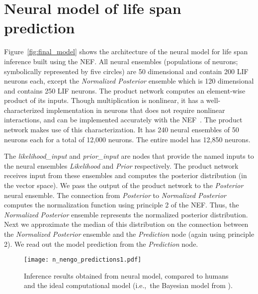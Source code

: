 \documentclass[10pt,letterpaper]{article}
\begin{document}


\section{Neural model of life span prediction}

Figure~\ref{fig:final_model} shows the architecture of the neural model for life span inference built using the NEF. All neural ensembles (populations of neurons; symbolically represented by five circles) are 50 dimensional and contain 200 LIF neurons each, except the \textit{Normalized Posterior} ensemble which is 120 dimensional and contains 250 LIF neurons. The product network computes an element-wise product of its inputs. Though multiplication is nonlinear, it has a well-characterized implementation in neurons that does not require nonlinear interactions, and can be implemented accurately with the NEF~\cite{gosmann2015}. The product network makes use of this characterization. It has 240 neural ensembles of 50 neurons each for a total of 12,000 neurons. The entire model has 12,850 neurons.

The \textit{likelihood\_input} and \textit{prior\_input} are nodes that provide the named inputs to the neural ensembles \textit{Likelihood} and \textit{Prior} respectively. The product network receives input from these ensembles and computes the posterior distribution (in the vector space). We pass the output of the product network to the \textit{Posterior} neural ensemble. The connection from \textit{Posterior} to \textit{Normalized Posterior} computes the normalization function using principle 2 of the NEF. Thus, the \textit{Normalized Posterior} ensemble represents the normalized posterior distribution. Next we approximate the median of this distribution on the connection between the \textit{Normalized Posterior} ensemble and the \textit{Prediction} node (again using principle 2). We read out the model prediction from the \textit{Prediction} node.

\begin{figure}[t!]
\begin{center}
\texttt{[image: n\_nengo\_predictions1.pdf]}
\end{center}
\caption{Inference results obtained from neural model, compared to humans and the ideal computational model (i.e.,~the Bayesian model from ).}
\label{fig:nengo_predictions}
\end{figure}
\end{document}
